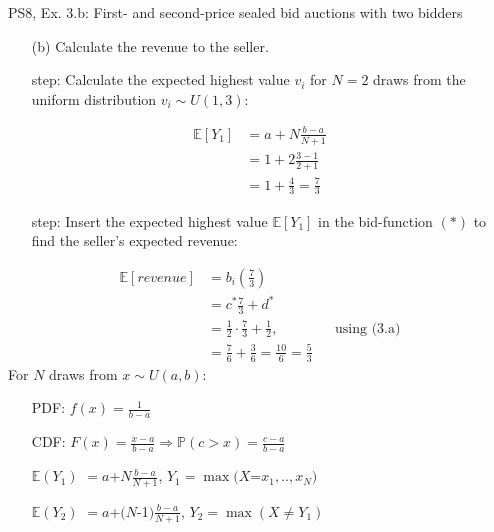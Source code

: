 \begin{frame}{PS8, Ex. 3.b: First- and second-price sealed bid auctions with two bidders}
    \begin{multicols}{2}
      \begin{itemize}
        \item[(b)] Calculate the revenue to the seller.
        \item[\nth{1} step:] Calculate the expected highest value $v_i$ for $N=2$ draws from the uniform distribution $v_i\sim U(1,3)$:
      \end{itemize}
      \vspace{-8pt}
      \begin{align*}
        \mathbb{E}[Y_1]&=a+N\frac{b-a}{N+1}\\
                       &=1+2\frac{3-1}{2+1}\\
                       &=1+\frac{4}{3}=\frac{7}{3}
      \end{align*}
      \vspace{-12pt}
      \begin{itemize}
        \item[\nth{2} step:] Insert the expected highest value $\mathbb{E}[Y_1]$ in the bid-function $(*)$  to find the seller's expected revenue:
      \end{itemize}
      \vspace{-8pt}
      \begin{align*}
        \mathbb{E}[revenue]&=b_i\left(\frac{7}{3}\right)\\
                           &= c^*\frac{7}{3}+d^*\\
                           &= \frac{1}{2}\cdot\frac{7}{3}+\frac{1}{2},&&\text{using (3.a)}\\
                           &= \frac{7}{6}+\frac{3}{6}=\frac{10}{6}=\frac{5}{3}
      \end{align*}
      \vfill\null\columnbreak
      For $N$ draws from $x\sim U(a, b):$
      \vspace{-6pt}
      \begin{enumerate}
        \item[PDF:] $f(x)=\frac{1}{b-a}$
        \item[CDF:] $F(x)=\frac{x-a}{b-a}\Rightarrow\mathbb{P}(c>x)=\frac{c-a}{b-a}$
        \item[$\mathbb{E}(Y_1)$] $=a$+$N\frac{b-a}{N+1}$, $Y_1=\max(X$=$x_1,..,x_N)$
        \item[$\mathbb{E}(Y_2)$] $=a$+$(N$-1$)\frac{b-a}{N+1}$, $Y_2=\max(X\neq Y_1)$
      \end{enumerate}

\end{multicols}
\end{frame}
